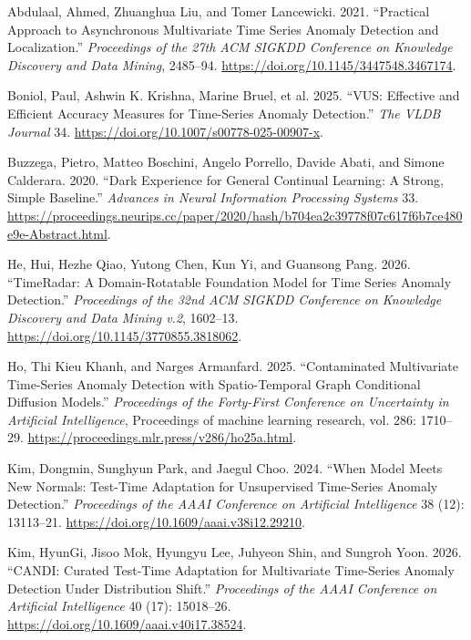 \documentclass[
  american,
]{article}
\newlength{\cslhangindent}
\newenvironment{CSLReferences}[2] %
 {\begin{list}{}{%
  \setlength{\itemindent}{0pt}
  \setlength{\leftmargin}{0pt}
  \setlength{\parsep}{0pt}
  \ifodd #1
   \setlength{\leftmargin}{\cslhangindent}
   \setlength{\itemindent}{-1\cslhangindent}
  \fi
  \setlength{\itemsep}{#2\baselineskip}}}
 {\end{list}}
\begin{document}
\protect{}\label{refs}
\begin{CSLReferences}{1}{1}
Abdulaal, Ahmed, Zhuanghua Liu, and Tomer Lancewicki. 2021. {``Practical
Approach to Asynchronous Multivariate Time Series Anomaly Detection and
Localization.''} \emph{Proceedings of the 27th ACM SIGKDD Conference on
Knowledge Discovery and Data Mining}, 2485--94.
\url{https://doi.org/10.1145/3447548.3467174}.

Boniol, Paul, Ashwin K. Krishna, Marine Bruel, et al. 2025. {``{VUS}:
Effective and Efficient Accuracy Measures for Time-Series Anomaly
Detection.''} \emph{The VLDB Journal} 34.
\url{https://doi.org/10.1007/s00778-025-00907-x}.

Buzzega, Pietro, Matteo Boschini, Angelo Porrello, Davide Abati, and
Simone Calderara. 2020. {``Dark Experience for General Continual
Learning: A Strong, Simple Baseline.''} \emph{Advances in Neural
Information Processing Systems} 33.
\url{https://proceedings.neurips.cc/paper/2020/hash/b704ea2c39778f07c617f6b7ce480e9e-Abstract.html}.

He, Hui, Hezhe Qiao, Yutong Chen, Kun Yi, and Guansong Pang. 2026.
{``{TimeRadar}: A Domain-Rotatable Foundation Model for Time Series
Anomaly Detection.''} \emph{Proceedings of the 32nd ACM SIGKDD
Conference on Knowledge Discovery and Data Mining v.2}, 1602--13.
\url{https://doi.org/10.1145/3770855.3818062}.

Ho, Thi Kieu Khanh, and Narges Armanfard. 2025. {``Contaminated
Multivariate Time-Series Anomaly Detection with Spatio-Temporal Graph
Conditional Diffusion Models.''} \emph{Proceedings of the Forty-First
Conference on Uncertainty in Artificial Intelligence}, Proceedings of
machine learning research, vol. 286: 1710--29.
\url{https://proceedings.mlr.press/v286/ho25a.html}.

Kim, Dongmin, Sunghyun Park, and Jaegul Choo. 2024. {``When Model Meets
New Normals: Test-Time Adaptation for Unsupervised Time-Series Anomaly
Detection.''} \emph{Proceedings of the AAAI Conference on Artificial
Intelligence} 38 (12): 13113--21.
\url{https://doi.org/10.1609/aaai.v38i12.29210}.

Kim, HyunGi, Jisoo Mok, Hyungyu Lee, Juhyeon Shin, and Sungroh Yoon.
2026. {``{CANDI}: Curated Test-Time Adaptation for Multivariate
Time-Series Anomaly Detection Under Distribution Shift.''}
\emph{Proceedings of the AAAI Conference on Artificial Intelligence} 40
(17): 15018--26. \url{https://doi.org/10.1609/aaai.v40i17.38524}.


\end{CSLReferences}
\end{document}
